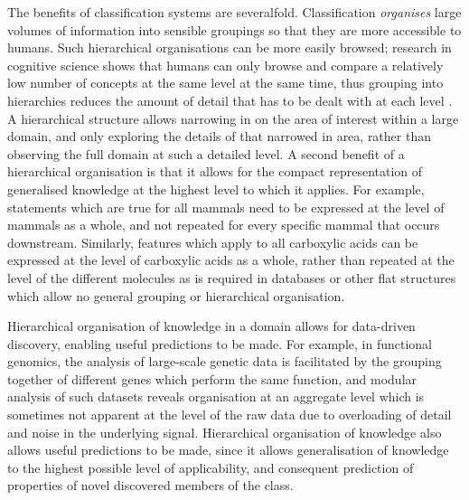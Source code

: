 \documentclass[10pt]{bmc_article}
\newenvironment{bmcformat}{\baselineskip20pt\sloppy\setboolean{publ}{false}}{\baselineskip20pt\sloppy}
\begin{document}
\begin{bmcformat}
The benefits of classification systems are severalfold. Classification \textit{organises} large volumes of information into sensible groupings so that they are more accessible to humans. Such hierarchical organisations can be more easily browsed; research in cognitive science shows that humans can only browse and compare a relatively low number of concepts at the same level at the same time, thus grouping into hierarchies reduces the amount of detail that has to be dealt with at each level \cite{sternberg2003}. A hierarchical structure allows narrowing in on the area of interest within a large domain, and only exploring the details of that narrowed in area, rather than observing the full domain at such a detailed level. A second benefit of a hierarchical organisation is that it allows for the compact representation of generalised knowledge at the highest level to which it applies.  For example, statements which are true for all mammals need to be expressed at the level of mammals as a whole, and not repeated for every specific mammal that occurs downstream.  Similarly, features which apply to all carboxylic acids can be expressed at the level of carboxylic acids as a whole, rather than repeated at the level of the different molecules as is required in databases or other flat structures which allow no general grouping or hierarchical organisation. 

Hierarchical organisation of knowledge in a domain allows for data-driven discovery, enabling useful predictions to be made.  For example, in functional genomics, the analysis of large-scale genetic data is facilitated by the grouping together of different genes which perform the same function, and modular analysis of such datasets reveals organisation at an aggregate level which is sometimes not apparent at the level of the raw data due to overloading of detail and noise in the underlying signal. %
Hierarchical organisation of knowledge also allows useful predictions to be made, since it allows generalisation of knowledge to the highest possible level of applicability, and consequent prediction of properties of novel discovered members of the class.  


\end{bmcformat}
\end{document}
